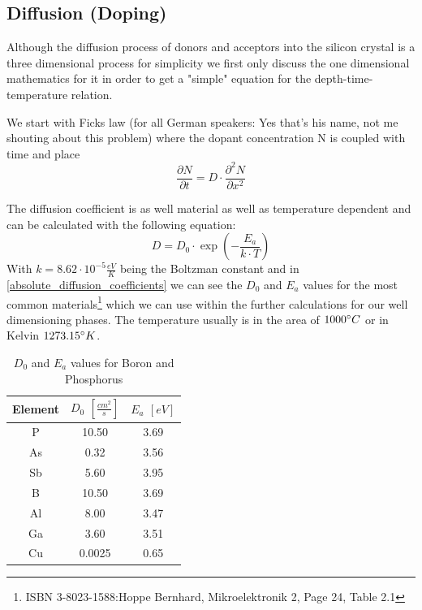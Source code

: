 \subsection{Diffusion (Doping)}

Although the diffusion process of donors and acceptors into the silicon crystal is a three dimensional process for simplicity we first only discuss the one dimensional mathematics for it in order to get a "simple" equation for the depth-time-temperature relation.

We start with Ficks law (for all German speakers: Yes that's his name, not me shouting about this problem) where the dopant concentration N is coupled with time and place
\begin{equation}
\frac{\partial N}{\partial t} = D \cdot \frac{\partial^2 N}{\partial x^2}
\end{equation}

The diffusion coefficient is as well material as well as temperature dependent  and can be calculated with the following equation:
\begin{equation}
D = D_0 \cdot \exp\left(-\frac{E_a}{k \cdot T}\right)
\end{equation}
With $k=8.62 \cdot 10^{-5} \frac{eV}{K}$ being the Boltzman constant and in \autoref{absolute_diffusion_coefficients} we can see the $D_0$ and $E_a$ values for the most common materials\footnote{ISBN 3-8023-1588:Hoppe Bernhard, Mikroelektronik 2, Page 24, Table 2.1} which we can use within the further calculations for our well dimensioning phases. The temperature usually is in the area of $1000\degree C$ or in Kelvin $1273.15\degree K$.
\begin{table}[H]
	\centering
	\begin{tabular}{|c|c|c|}
		\hline
		Element &
		$D_0$ $\left[\frac{cm^2}{s}\right]$ &
		$E_a$ $\left[eV\right]$ \\
		\hline
		P &
		10.50 &
		3.69 \\
		\hline
		As &
		0.32 &
		3.56 \\
		\hline
		Sb &
		5.60 &
		3.95 \\
		\hline
		B &
		10.50 &
		3.69 \\
		\hline
		Al &
		8.00 &
		3.47 \\
		\hline
		Ga &
		3.60 &
		3.51 \\
		\hline
		Cu &
		0.0025 &
		0.65 \\
		\hline
	\end{tabular}
	\label{absolute_diffusion_coefficients}
	\caption{$D_0$ and $E_a$ values for Boron and Phosphorus}
\end{table}

